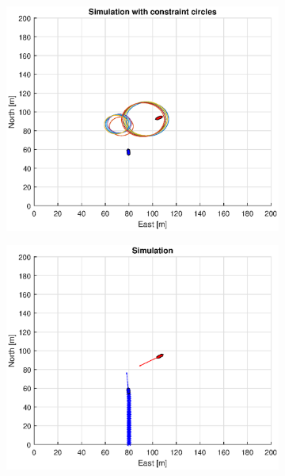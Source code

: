 \begin{figure}[ht]\ContinuedFloat
    \begin{subfigure}[b]{0.49\textwidth}
        \centering
        \includegraphics[width=\textwidth]{Images/Figures/sving_GW/Simple0_f1_Frame4}
    \end{subfigure}
    \hfill
    \begin{subfigure}[b]{0.499\textwidth}
        \centering
        \includegraphics[width=\textwidth]{Images/Figures/sving_GW/Simple0_f600_Frame4}

\end{subfigure}
\end{figure}
